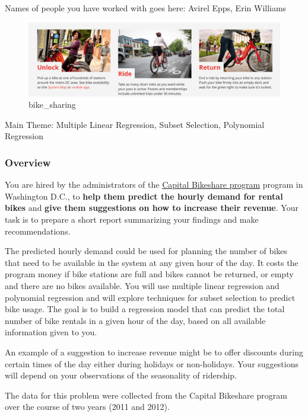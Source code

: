 \documentclass[11pt]{article}
\makeatletter
\def\maxwidth{\ifdim\Gin@nat@width>\linewidth\linewidth
    \else\Gin@nat@width\fi}
\let\Oldincludegraphics\includegraphics
\renewcommand{\includegraphics}[1]{\Oldincludegraphics[width=.8\maxwidth]{#1}}
\makeatother
\begin{document}
Names of people you have worked with goes here: Avirel Epps, Erin
Williams

    

    \begin{figure}
\centering
\includegraphics{fig/BSS.png}
\caption{bike\_sharing}
\end{figure}

Main Theme: Multiple Linear Regression, Subset Selection, Polynomial
Regression

\subsubsection{Overview}\label{overview}

You are hired by the administrators of the
\href{https://www.capitalbikeshare.com}{Capital Bikeshare program}
program in Washington D.C., to \textbf{help them predict the hourly
demand for rental bikes} and \textbf{give them suggestions on how to
increase their revenue}. Your task is to prepare a short report
summarizing your findings and make recommendations.

The predicted hourly demand could be used for planning the number of
bikes that need to be available in the system at any given hour of the
day. It costs the program money if bike stations are full and bikes
cannot be returned, or empty and there are no bikes available. You will
use multiple linear regression and polynomial regression and will
explore techniques for subset selection to predict bike usage. The goal
is to build a regression model that can predict the total number of bike
rentals in a given hour of the day, based on all available information
given to you.

An example of a suggestion to increase revenue might be to offer
discounts during certain times of the day either during holidays or
non-holidays. Your suggestions will depend on your observations of the
seasonality of ridership.

The data for this problem were collected from the Capital Bikeshare
program over the course of two years (2011 and 2012).
\end{document}
